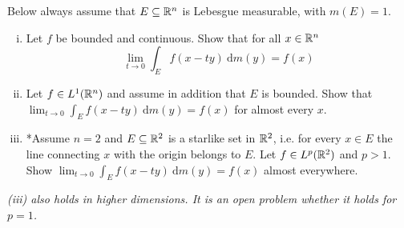 \begin{problem}
  Below always assume that $E \subseteq \mathbb R^n$ is Lebesgue measurable, with $m(E) = 1$.
  \begin{enumerate}[(i)]
    \item Let $f$ be bounded and continuous. Show that for all $x\in\mathbb R^n$
    \[\lim_{t\to0}\int_E f(x-ty) \ \mathrm{d}m(y) = f(x)\]
    \item Let $f \in L^1(\mathbb R^n)$ and assume in addition that $E$ is bounded. 
    Show that $\lim_{t\to0}\int_E f(x-ty) \ \mathrm{d}m(y) = f(x)$ for almost every $x$.
    \item *Assume $n=2$ and $E \subseteq \mathbb R^2$ is a starlike set in $\mathbb R^2$, i.e.
    for every $x \in E$ the line connecting $x$ with the origin belongs to $E$.
    Let $f \in L^p(\mathbb R^2)$ and $p > 1$. Show $\lim_{t\to0}\int_E f(x-ty)\ \mathrm{d}m(y) = f(x)$
    almost everywhere.
  \end{enumerate}
  \textit{(iii) also holds in higher dimensions. It is an open problem whether it holds for $p=1$.}
\end{problem}